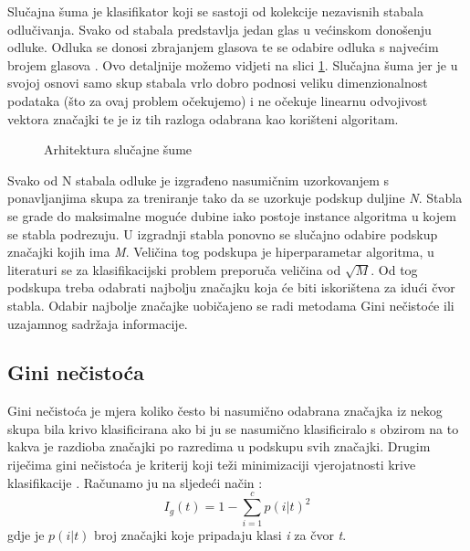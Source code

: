 Slučajna šuma \cite{breiman} je klasifikator koji se sastoji od kolekcije nezavisnih stabala odlučivanja. Svako od stabala predstavlja jedan glas u većinskom donošenju odluke. Odluka se donosi zbrajanjem glasova te se odabire odluka s najvećim brojem glasova \cite{rfdef}. Ovo detaljnije možemo vidjeti na slici \ref{fig:rf}. Slučajna šuma jer je u svojoj osnovi samo skup stabala vrlo dobro podnosi veliku dimenzionalnost podataka (što za ovaj problem očekujemo) i ne očekuje linearnu odvojivost vektora značajki te je iz tih razloga odabrana kao korišteni algoritam.  \\

\begin{figure}[H]
	\centering
	\caption{Arhitektura slučajne šume \cite{fig-rf}}
	\label{fig:rf}
\end{figure}

	
	Svako od N stabala odluke je izgrađeno nasumičnim uzorkovanjem s ponavljanjima skupa za treniranje tako da se uzorkuje podskup duljine \textit{N}. Stabla se grade do maksimalne moguće dubine iako postoje instance algoritma u kojem se stabla podrezuju. U izgradnji stabla ponovno se slučajno odabire podskup značajki kojih ima \textit{M}. Veličina tog podskupa je hiperparametar algoritma, u literaturi \cite{statisticallearning} se za klasifikacijski problem preporuča veličina od $\sqrt{M}$. Od tog podskupa treba odabrati najbolju značajku koja će biti iskorištena za idući čvor stabla. Odabir najbolje značajke uobičajeno se radi metodama Gini nečistoće ili uzajamnog sadržaja informacije.
	
\subsection{Gini nečistoća}

Gini nečistoća je mjera koliko često bi nasumično odabrana značajka iz nekog skupa bila krivo klasificirana ako bi ju se nasumično klasificiralo s obzirom na to kakva je razdioba značajki po razredima u podskupu svih značajki. Drugim riječima gini nečistoća je kriterij koji teži minimizaciji vjerojatnosti krive klasifikacije \cite{cse}. Računamo ju na sljedeći način \cite{gidef}:
\begin{equation}
	I_g(t) = 1 -  \sum_{i=1}^{c} p(i | t)^{2}
\end{equation}
gdje je $p(i | t)$ broj značajki koje pripadaju klasi \textit{i} za čvor \textit{t}. 

